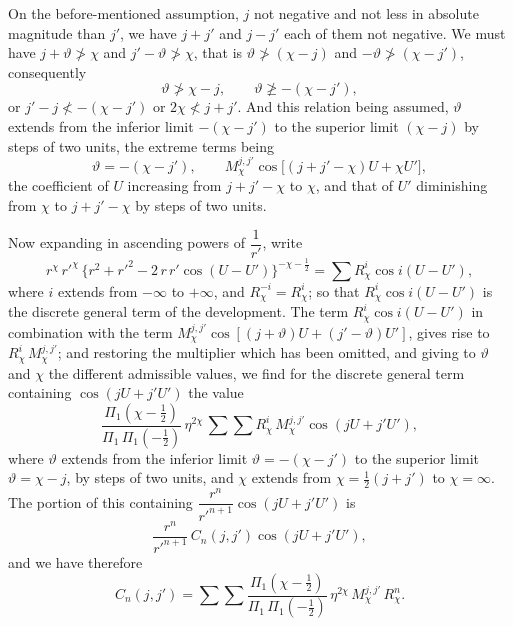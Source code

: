 \documentclass[12pt,a4paper]{article}
\theoremstyle{plain}
\begin{document}
\medskip
On the before-mentioned assumption, $j$ not negative and not less in absolute magnitude than $j'$, we have $j+j'$ and $j-j'$ each of them not negative. We must have $j+\vartheta\not> \chi$ and $j'-\vartheta\not> \chi$, that is $\vartheta\not> (\chi-j)$ and $-\vartheta\not> (\chi-j')$, consequently
\[
\vartheta\not> \chi-j,\qquad \vartheta\not\geqslant -(\chi-j'),
\]
or $j'-j\not< -(\chi-j')$ or $2\chi\not<j+j'$. And this relation being assumed, $\vartheta$ extends from the inferior limit $-(\chi-j')$ to the superior limit $(\chi-j)$ by steps of two units, the extreme terms being
\[
\vartheta=-(\chi-j'),\qquad M_{\chi}^{j,j'}\cos\bigl[(j+j'-\chi)U+\chi U'\bigr],
\]
the coefficient of $U$ increasing from $j+j'-\chi$ to $\chi$, and that of $U'$ diminishing from $\chi$ to $j+j'-\chi$ by steps of two units.

\newpage
{} Now expanding in ascending powers of $\dfrac{1}{r'}$, write
\[
r^{\chi}\,r'^{\chi}\,\bigl\{r^{2}+r'^{2}-2\,r\,r'\cos(U-U')\bigr\}^{-\chi-\tfrac{1}{2}}=\sum R_{\chi}^{i}\cos i(U-U'),
\]
where $i$ extends from $-\infty$ to $+\infty$, and $R_{\chi}^{-i}=R_{\chi}^{i}$; so that $R_{\chi}^{i}\cos i(U-U')$ is the discrete general term of the development. The term $R_{\chi}^{i}\cos i(U-U')$ in combination with the term $M_{\chi}^{j,j'}\cos[(j+\vartheta)U+(j'-\vartheta)U']$, gives rise to $R_{\chi}^{i}\,M_{\chi}^{j,j'}$; and restoring the multiplier which has been omitted, and giving to $\vartheta$ and $\chi$ the different admissible values, we find for the discrete general term containing $\cos(jU+j'U')$ the value
\[
\dfrac{\Pi_{1}(\chi-\tfrac{1}{2})}{\Pi_{1}\,\Pi_{1}(-\tfrac{1}{2})}\,\eta^{2\chi}\,\sum\sum R_{\chi}^{i}\,M_{\chi}^{j,j'}\cos(jU+j'U'),
\]
where $\vartheta$ extends from the inferior limit $\vartheta=-(\chi-j')$ to the superior limit $\vartheta=\chi-j$, by steps of two units, and $\chi$ extends from $\chi=\tfrac{1}{2}(j+j')$ to $\chi=\infty$. The portion of this containing $\dfrac{r^{n}}{r'^{n+1}}\cos(jU+j'U')$ is
\[
\dfrac{r^{n}}{r'^{n+1}}\,C_{n}(j,j')\cos(jU+j'U'),
\]
and we have therefore
\[
C_{n}(j,j')=\sum\!\sum\dfrac{\Pi_{1}(\chi-\tfrac{1}{2})}{\Pi_{1}\,\Pi_{1}(-\tfrac{1}{2})}\,\eta^{2\chi}\,M_{\chi}^{j,j'}\,R_{\chi}^{n}.
\]
\end{document}
